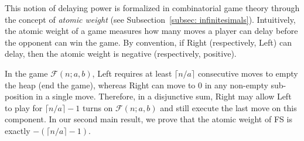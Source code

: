 \documentclass[oneside,reqno]{amsart}
\newcommand{\fs}{\mathcal{F}}
\begin{document}






This notion of delaying power is formalized in combinatorial game theory through the concept of \emph{atomic weight} (see Subsection~\ref{subsec: infinitesimals}).
Intuitively, the atomic weight of a game measures how many moves a player can delay before the opponent can win the game. By convention, if Right (respectively, Left) can delay, then the atomic weight is negative (respectively, positive).

In the game $\fs(n;a,b)$, Left requires at least $\lceil n/a\rceil$ consecutive moves to empty the heap (end the game), whereas Right can move to $0$ in any non-empty sub-position in a single move. Therefore, in a disjunctive sum, Right may allow Left to play for $\lceil n/a\rceil-1$ turns on $\fs(n;a,b)$ and still execute the last move on this component. In our second main result, we prove that the atomic weight of {\sc FS} is exactly $-(\lceil n/a\rceil-1)$.%
\end{document}
